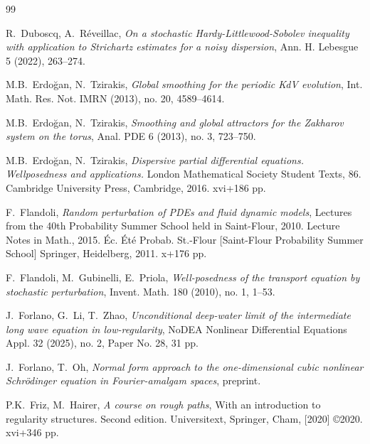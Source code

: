 \documentclass[letterpaper, 11pt,  reqno]{amsart}
\newcommand{\1}{\hspace{0.5mm}\text{I}\hspace{0.5mm}}
\numberwithin{equation}{section}
\numberwithin{theorem}{section}
\begin{document}
\begin{thebibliography}{99}
 

R.~Duboscq, A.~R\'eveillac, 
{\it On a stochastic Hardy-Littlewood-Sobolev inequality with application to Strichartz estimates for a noisy dispersion}, 
Ann. H. Lebesgue 5 (2022), 263--274. 


M.B.~Erdo\u{g}an, N.~Tzirakis, 
{\it Global smoothing for the periodic KdV evolution}, 
Int. Math. Res. Not. IMRN (2013), no. 20, 4589--4614.


M.B.~Erdo\u{g}an, N.~Tzirakis, 
{\it Smoothing and global attractors for the Zakharov system on the torus},
 Anal. PDE 6 (2013), no. 3, 723--750.


M.B.~Erdo\u{g}an, N.~Tzirakis, 
{\it Dispersive partial differential equations. Wellposedness and applications.} London Mathematical Society Student Texts, 86. Cambridge University Press, Cambridge, 2016. xvi+186 pp.


F.~Flandoli, 
{\it Random perturbation of PDEs and fluid dynamic models},
 Lectures from the 40th Probability Summer School held in Saint-Flour, 2010. Lecture Notes in Math., 2015. 
 \'Ec. \'Et\'e Probab. St.-Flour [Saint-Flour Probability Summer School] Springer, Heidelberg, 2011. x+176 pp.




F.~Flandoli, M.~Gubinelli, E.~Priola,
{\it Well-posedness of the transport equation by stochastic perturbation},
Invent. Math. 180 (2010), no. 1, 1--53.





J.~Forlano, G.~Li, T.~Zhao,
{\it Unconditional deep-water limit of the intermediate long wave equation in low-regularity},
 NoDEA Nonlinear Differential Equations Appl. 32 (2025), no. 2, Paper No. 28, 31 pp.


J.~Forlano, T.~Oh, 
{\it  Normal form approach to the one-dimensional cubic nonlinear Schr\"odinger equation in Fourier-amalgam spaces}, preprint.





P.K.~Friz,  M.~Hairer, 
{\it A course on rough paths}, 
With an introduction to regularity structures. Second edition.
Universitext, Springer, Cham, [2020] \copyright 2020. xvi+346 pp.




\end{thebibliography}
\end{document}
